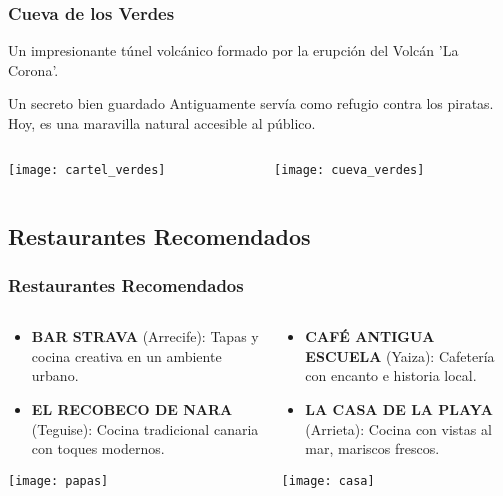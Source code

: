 \documentclass{beamer}
\begin{document}
	\begin{frame}
		\frametitle{Cueva de los Verdes}
		Un impresionante túnel volcánico formado por la erupción del Volcán 'La Corona'.
		
		\begin{block}{Un secreto bien guardado}
			Antiguamente servía como refugio contra los piratas. Hoy, es una maravilla natural accesible al público.
		\end{block}
		
		\begin{columns}[c]
			\begin{column}{0.5\textwidth}
				\centering
				\texttt{[image: cartel\_verdes]}
				\label{fig:cartel_verdes}
			\end{column}
			\begin{column}{0.5\textwidth}
				\centering
				\texttt{[image: cueva\_verdes]}
				\label{fig:cueva_verdes}
			\end{column}
		\end{columns}
	\end{frame}
	
	
	
	
	\begin{frame}
		
		\section{Restaurantes Recomendados}
		\frametitle{Restaurantes Recomendados}
		
		\begin{columns}[c]
			\begin{column}{0.5\textwidth}
				\begin{itemize}
					\item \textbf{BAR STRAVA} (Arrecife): Tapas y cocina creativa en un ambiente urbano.
					\item \textbf{EL RECOBECO DE NARA} (Teguise): Cocina tradicional canaria con toques modernos.
					
				\end{itemize}
				\centering
				\texttt{[image: papas]}
				\label{fig:papas}
			\end{column}
			\begin{column}{0.5\textwidth}
				\begin{itemize}
					\item \textbf{CAFÉ ANTIGUA ESCUELA} (Yaiza): Cafetería con encanto e historia local.
					\item \textbf{LA CASA DE LA PLAYA} (Arrieta): Cocina con vistas al mar, mariscos frescos.
					
				\end{itemize}
				\centering
				\texttt{[image: casa]}
				\label{fig:casa}
			\end{column}
		\end{columns}
		
		
	\end{frame}
	
\end{document}
